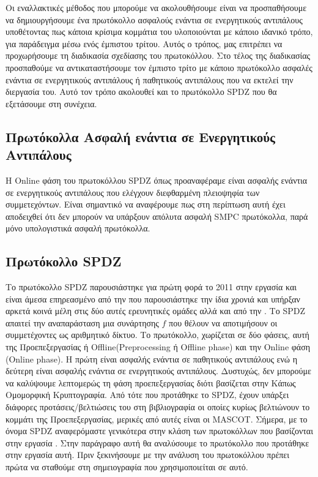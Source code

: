 Οι εναλλακτικές μέθοδος που μπορούμε να ακολουθήσουμε είναι να προσπαθήσουμε να δημιουργήσουμε ένα πρωτόκολλο ασφαλούς ενάντια σε ενεργητικούς αντιπάλους υποθέτοντας πως κάποια κρίσιμα κομμάτια του υλοποιούνται με κάποιο ιδανικό τρόπο, για παράδειγμα μέσω ενός έμπιστου τρίτου. Αυτός ο τρόπος, μας επιτρέπει να προχωρήσουμε τη διαδικασία σχεδίασης του πρωτοκόλλου. Στο τέλος της διαδικασίας προσπαθούμε να αντικαταστήσουμε τον έμπιστο τρίτο με κάποιο πρωτόκολλο ασφαλές ενάντια σε ενεργητικούς αντιπάλους ή παθητικούς αντιπάλους που να εκτελεί την διεργασία του. Αυτό τον τρόπο ακολουθεί και το πρωτόκολλο SPDZ που θα εξετάσουμε στη συνέχεια.

\subsection{Πρωτόκολλα Ασφαλή ενάντια σε Ενεργητικούς Αντιπάλους}

Η Online φάση του πρωτοκόλλου SPDZ όπως προαναφέραμε είναι ασφαλής ενάντια σε ενεργητικούς αντιπάλους που ελέγχουν διεφθαρμένη πλειοψηφία των συμμετεχόντων. Είναι σημαντικό να αναφέρουμε πως στη περίπτωση αυτή έχει αποδειχθεί ότι δεν μπορούν να υπάρξουν απόλυτα ασφαλή SMPC πρωτόκολλα, παρά μόνο υπολογιστικά ασφαλή πρωτόκολλα.

\subsection{Πρωτόκολλο SPDZ}

Το πρωτόκολλο SPDZ παρουσιάστηκε για πρώτη φορά το 2011 στην εργασία \cite{cryptoeprint:2011/535} και είναι άμεσα επηρεασμένο από την \cite{bendlin2011semi} που παρουσιάστηκε την ίδια χρονιά και υπήρξαν αρκετά κοινά μέλη στις δύο αυτές ερευνητικές ομάδες αλλά και από την \cite{ishai2007zero}. Το SPDZ απαιτεί την αναπαράσταση μια συνάρτησης $f$ που θέλουν να αποτιμήσουν οι συμμετέχοντες ως αριθμητικό δίκτυο. Το πρωτόκολλο, χωρίζεται σε δύο φάσεις, αυτή της Προεπεξεργασίας ή Offline(Preprocessing ή Offline phase) και την Online φάση (Online phase). Η πρώτη είναι ασφαλής ενάντια σε παθητικούς αντιπάλους ενώ η δεύτερη είναι ασφαλής ενάντια σε ενεργητικούς αντιπάλους. Δυστυχώς, δεν μπορούμε να καλύψουμε λεπτομερώς τη φάση προεπεξεργασίας διότι βασίζεται στην Κάπως Ομομορφική Κρυπτογραφία. Από τότε που προτάθηκε το SPDZ, έχουν υπάρξει διάφορες προτάσεις/βελτιώσεις του στη βιβλιογραφία οι οποίες κυρίως βελτιώνουν το κομμάτι της Προεπεξεργασίας, μερικές από αυτές είναι οι MASCOT. Σήμερα, με το όνομα SPDZ αναφερόμαστε γενικότερα στην κλάση των πρωτοκόλλων που βασίζονται στην εργασία \cite{cryptoeprint:2011/535}. Στην παράγραφο αυτή θα αναλύσουμε το πρωτόκολλο που προτάθηκε στην εργασία αυτή. Πριν ξεκινήσουμε με την ανάλυση του πρωτοκόλλου πρέπει πρώτα να σταθούμε στη σημειογραφία που χρησιμοποιείται σε αυτό.

